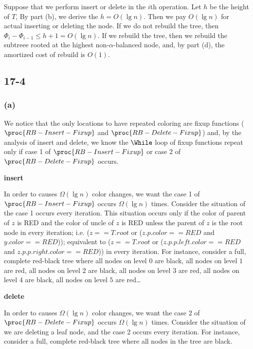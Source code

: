 Suppose that we perform insert or delete in the $i$th operation.
Let $h$ be the height of $T$,
By part (b), we derive the $h = O(\lg n)$.
Then we pay $O(\lg n)$ for actual inserting or deleting the node.
If we do not rebuild the tree, 
then $\Phi_i - \Phi_{i-1} \leq h + 1 = O(\lg n)$.
If we rebuild the tree,
then we rebuild the subtreee rooted at the highest 
non-$\alpha$-balanced node, and, by part (d), 
the amortized cost of rebuild is $O(1)$.

\subsection*{17-4}

\subsubsection*{(a)}

We notice that the only locations to have repeated coloring 
are fixup functions 
($\proc{RB-Insert-Fixup}$ and $\proc{RB-Delete-Fixup}$)
and, by the analysis of insert and delete,
we know the $\While$ loop of fixup functions repeat
only if case 1 of $\proc{RB-Insert-Fixup}$ or
case 2 of $\proc{RB-Delete-Fixup}$ occurs.

\textbf{insert}

In order to causes $\Omega(\lg n)$ color changes,
we want the case 1 of $\proc{RB-Insert-Fixup}$ 
occurs $\Omega(\lg n)$ times.
Consider the situation of the case 1 occurs every iteration.
This situation occurs only if
the color of parent of $z$ is RED
and the color of uncle of $z$ is RED
unless the parent of $z$ is the root node in every iteration;
i.e. ($z == T.root$ or ($z.p.color == RED$ and $y.color == RED$));
equivalent to ($z == T.root$ or 
($z.p.p.left.color == RED$ and $z.p.p.right.color == RED$))
in every iteration.
For instance, consider a full, complete red-black tree where 
all nodes on level $0$ are black,
all nodes on level $1$ are red, 
all nodes on level $2$ are black, 
all nodes on level $3$ are red, 
all nodes on level $4$ are black, 
all nodes on level $5$ are red\dots

\textbf{delete}

In order to causes $\Omega(\lg n)$ color changes,
we want the case 2 of $\proc{RB-Delete-Fixup}$ 
occurs $\Omega(\lg n)$ times.
Consider the situation of we are deleting a leaf node,
and the case 2 occurs every iteration.
For instance, consider a full, complete red-black tree where 
all nodes in the tree are black.

